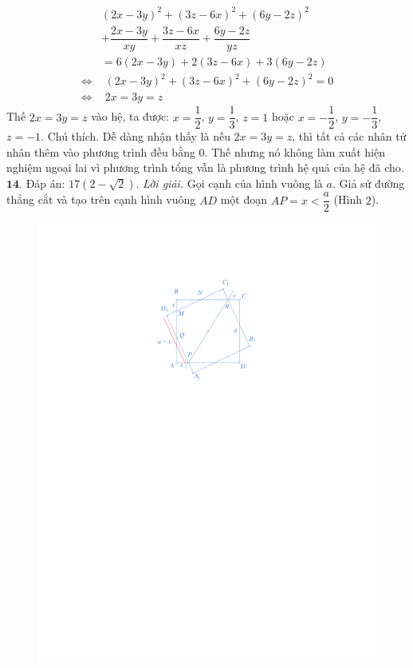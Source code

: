 \begin{multicols}{2}
	\begin{align*}
		&{\left( {2x - 3y} \right)^2} + {\left( {3z - 6x} \right)^2} + {\left( {6y - 2z} \right)^2} \\
		&+ \dfrac{{2x - 3y}}{{xy}} + \dfrac{{3z - 6x}}{{xz}} + \dfrac{{6y - 2z}}{{yz}}\\
		&= 6\left( {2x \!-\! 3y} \right) \!+\! 2\left( {3z \!-\! 6x} \right) \!+\! 3\left( {6y \!-\! 2z} \right)\\
		\Leftrightarrow &\,\,{\left( {2x \!-\! 3y} \right)^2} \!+\! {\left( {3z \!-\! 6x} \right)^2} \!+\! {\left( {6y \!-\! 2z} \right)^2} \!=\! 0\\
		\Leftrightarrow &\,\,2x = 3y = z
	\end{align*}
	Thế $2x = 3y = z$ vào hệ, ta được:  $x = \dfrac{1}{2}$, $y = \dfrac{1}{3}$, $z =1$ hoặc $x = - \dfrac{1}{2}$, $y = - \dfrac{1}{3}$,  $z = -1$.
	\vskip 0.1cm 
	Chú thích. Dễ dàng nhận thấy là nếu  $2x = 3y = z$, thì tất cả các nhân tử nhân thêm vào phương trình đều bằng $0$. Thế nhưng nó không làm xuất hiện nghiệm ngoại lai vì phương trình tổng vẫn là phương trình hệ quả của hệ đã cho.
	\vskip 0.1cm
	$\pmb{14.}$ Đáp án:  $17\left( {2 - \sqrt 2 } \right)$.
	\vskip 0.1cm 
	\textit{Lời giải.} Gọi cạnh của hình vuông là $a$. Giả sử đường thẳng cắt và tạo trên cạnh hình vuông $AD$ một đoạn $AP = x < \dfrac{a}{2}$  (Hình $2$).
	\begin{figure}[H]
		\vspace*{-5pt}
		\centering
		\captionsetup{labelformat= empty, justification=centering}
		\includegraphics[width= 1\linewidth]{1a.pdf}

\end{figure}
\end{multicols}

